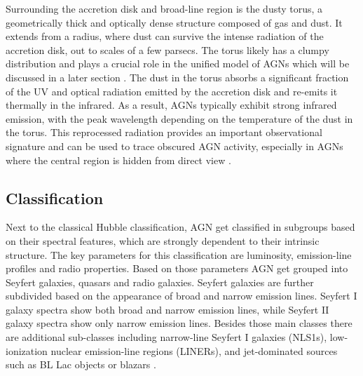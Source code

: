 Surrounding the accretion disk and broad-line region is the dusty torus, a geometrically thick and optically dense structure composed of gas and dust. It extends from a radius, where dust can survive the intense radiation of the accretion disk, out to scales of a few parsecs. The torus likely has a clumpy distribution and plays a crucial role in the unified model of AGNs which will be discussed in a later section \parencite{netzer2013agn,hickox2018obscured}.
The dust in the torus absorbs a significant fraction of the UV and optical radiation emitted by the accretion disk and re-emits it thermally in the infrared. As a result, AGNs typically exhibit strong infrared emission, with the peak wavelength depending on the temperature of the dust in the torus. This reprocessed radiation provides an important observational signature and can be used to trace obscured AGN activity, especially in AGNs where the central region is hidden from direct view \parencite{netzer2013agn}.



\subsection{Classification}
\label{sec:classification}

Next to the classical Hubble classification, AGN get classified in subgroups based on their spectral features, which are strongly dependent to their intrinsic structure. The key parameters for this classification are luminosity, emission-line profiles and radio properties. Based on those parameters AGN get grouped into Seyfert galaxies, quasars and radio galaxies. Seyfert galaxies are further subdivided based on the appearance of broad and narrow emission lines. Seyfert I galaxy spectra show both broad and narrow emission lines, while Seyfert II galaxy spectra show only narrow emission lines. Besides those main classes there are additional sub-classes including narrow-line Seyfert I galaxies (NLS1s), low-ionization nuclear emission-line regions (LINERs), and jet-dominated sources such as BL Lac objects or blazars \parencite{antonucci1993unified, urry1995unified}. 


